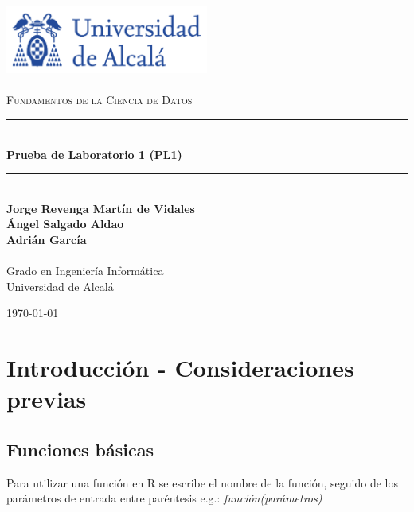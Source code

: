 \documentclass[a4paper, 12pt]{article}
\newcommand{\HRule}{\rule{\linewidth}{0.5mm}}
\begin{document}
	\begin{titlepage}
		\begin{center}
			\includegraphics[width=0.5\textwidth]{logoUAH.png}~\\[2cm]
			
			\textsc{\Large \\Fundamentos de la Ciencia de Datos}\\[2cm]
			
			\HRule \\[0.4cm]
			{\LARGE \bfseries Prueba de Laboratorio 1 (PL1) \\[0.4cm]}
			\HRule \\[2cm]
			
			\large\textbf{Jorge Revenga Martín de Vidales}\\
			\large\textbf{Ángel Salgado Aldao}\\
			\large\textbf{Adrián García}\\
			\large\textbf{}\\ Grado en Ingeniería Informática \\ Universidad de Alcalá
			
			\vfill
			
			{\large \today}
		\end{center}
	\end{titlepage}
	
	\pagestyle{fancy}
	\fancyhf{} %
	\fancyfoot[RO,LE]{\thepage}  %
	\newpage
	
	\thispagestyle{plain}
	\tableofcontents


\newpage
\section{Introducción - Consideraciones previas}
    \subsection{Funciones básicas}
        Para utilizar una función en R se escribe el nombre de la función, seguido de los parámetros de entrada entre paréntesis e.g.: \emph{función(parámetros)}
        
\end{document}
